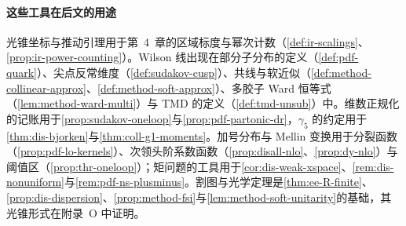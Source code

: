 \paragraph{这些工具在后文的用途}
光锥坐标与推动引理用于第~4~章的区域标度与幂次计数（\cref{def:ir-scalings}、\cref{prop:ir-power-counting}）。Wilson 线出现在部分子分布的定义（\cref{def:pdf-quark}）、尖点反常维度（\cref{def:sudakov-cusp}）、共线与软近似（\cref{def:method-collinear-approx}、\cref{def:method-soft-approx}）、多胶子 Ward 恒等式（\cref{lem:method-ward-multi}）与 TMD 的定义（\cref{def:tmd-unsub}）中。维数正规化的记账用于\cref{prop:sudakov-oneloop}与\cref{prop:pdf-partonic-dr}，$\gamma_5$ 的约定用于\cref{thm:dis-bjorken}与\cref{thm:coll-g1-moments}。加号分布与 Mellin 变换用于分裂函数（\cref{prop:pdf-lo-kernels}）、次领头阶系数函数（\cref{prop:disall-nlo}、\cref{prop:dy-nlo}）与阈值区（\cref{prop:thr-oneloop}）；矩问题的工具用于\cref{cor:dis-weak-xspace}、\cref{rem:dis-nonuniform}与\cref{rem:pdf-ns-plusminus}。割图与光学定理是\cref{thm:ee-R-finite}、\cref{prop:dis-dispersion}、\cref{prop:method-fsi}与\cref{lem:method-soft-unitarity}的基础，其光锥形式在附录~O 中证明。


